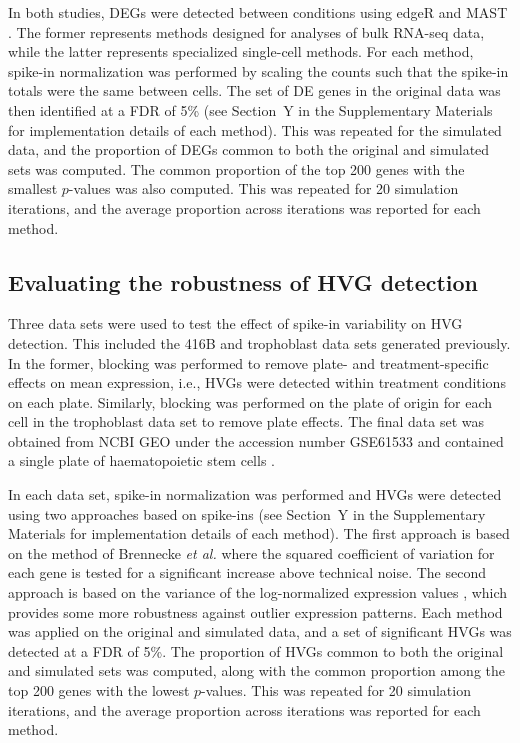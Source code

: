 \documentclass{article}
\begin{document}
In both studies, DEGs were detected between conditions using edgeR \cite{robinson2010edgeR} and MAST \cite{finak2015mast}.
The former represents methods designed for analyses of bulk RNA-seq data, while the latter represents specialized single-cell methods.
For each method, spike-in normalization was performed by scaling the counts such that the spike-in totals were the same between cells.
The set of DE genes in the original data was then identified at a FDR of 5\% (see Section~Y in the Supplementary Materials for implementation details of each method).
This was repeated for the simulated data, and the proportion of DEGs common to both the original and simulated sets was computed.
The common proportion of the top 200 genes with the smallest $p$-values was also computed.
This was repeated for 20 simulation iterations, and the average proportion across iterations was reported for each method.

\subsection{Evaluating the robustness of HVG detection}
Three data sets were used to test the effect of spike-in variability on HVG detection.
This included the 416B and trophoblast data sets generated previously.
In the former, blocking was performed to remove plate- and treatment-specific effects on mean expression, i.e., HVGs were detected within treatment conditions on each plate.
Similarly, blocking was performed on the plate of origin for each cell in the trophoblast data set to remove plate effects.
The final data set was obtained from NCBI GEO under the accession number GSE61533 and contained a single plate of haematopoietic stem cells \cite{wilson2016 combined}.

In each data set, spike-in normalization was performed and HVGs were detected using two approaches based on spike-ins (see Section~Y in the Supplementary Materials for implementation details of each method).
The first approach is based on the method of Brennecke \textit{et al.} \cite{brennecke2013accounting} where the squared coefficient of variation for each gene is tested for a significant increase above technical noise.
The second approach is based on the variance of the log-normalized expression values \cite{lun2016step}, which provides some more robustness against outlier expression patterns.
Each method was applied on the original and simulated data, and a set of significant HVGs was detected at a FDR of 5\%.
The proportion of HVGs common to both the original and simulated sets was computed, along with the common proportion among the top 200 genes with the lowest $p$-values.
This was repeated for 20 simulation iterations, and the average proportion across iterations was reported for each method.
\end{document}
